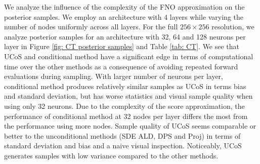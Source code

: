 \documentclass[10pt]{article} %
\theoremstyle{plain}
\theoremstyle{definition}
\theoremstyle{remark}
\begin{document}
We analyze the influence of the complexity of the FNO approximation on the posterior samples. We employ an architecture with 4 layers while varying the number of nodes uniformly across all layers. For the full $256 \times 256$ resolution, we analyze posterior samples for an architecture with 32, 64 and 128 neurons per layer in Figure \ref{fig: CT posterior samples} and Table \ref{tab: CT}. We see that UCoS and conditional method have a significant edge in terms of computational time over the other methods as a consequence of avoiding repeated forward evaluations during sampling. With larger number of neurons per layer, conditional method produces relatively similar samples as UCoS in terms bias and standard deviation, but has worse statistics and visual sample quality when using only 32 neurons. Due to the complexity of the score approximation, the performance of conditional method at 32 nodes per layer differs the most from the performance using more nodes.
Sample quality of UCoS seems comparable or better to the unconditional methods (SDE ALD, DPS and Proj) in terms of standard deviation and bias and a naive visual inspection. Noticeably, UCoS generates samples with low variance compared to the other methods.
\end{document}
